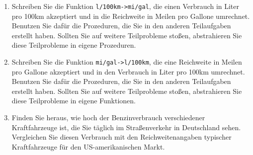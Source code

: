 \begin{aufgabe}
\begin{enumerate}
  \item Schreiben Sie die Funktion
    \texttt{l/100km->mi/gal}, die einen Verbrauch in Liter pro 100km
    akzeptiert und in die Reichweite in Meilen pro Gallone umrechnet.
    Benutzen Sie dafür die Prozeduren, die Sie in den anderen
    Teilaufgaben erstellt haben.  Sollten Sie auf weitere Teilprobleme
    stoßen, abstrahieren Sie diese Teilprobleme in eigene Prozeduren.

  \item Schreiben Sie die Funktion
    \texttt{mi/gal->l/100km}, die eine Reichweite in Meilen pro
    Gallone akzeptiert und in den Verbrauch in Liter pro 100km
    umrechnet.  Benutzen Sie dafür die Prozeduren, die Sie in den
    anderen Teilaufgaben erstellt haben.  Sollten Sie auf weitere
    Teilprobleme stoßen, abstrahieren Sie diese Teilprobleme in eigene
    Funktionen.

  \item Finden Sie heraus, wie hoch der Benzinverbrauch
    verschiedener Kraftfahrzeuge ist, die Sie täglich im
    Straßenverkehr in Deutschland sehen.  Vergleichen Sie diesen
    Verbrauch mit den Reichweitenangaben typischer Kraftfahrzeuge für
    den US-amerikanischen Markt.
  \end{enumerate}

\end{aufgabe}





